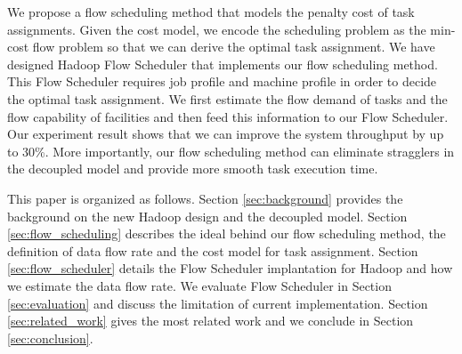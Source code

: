 We propose a flow scheduling method that models the penalty cost of task assignments.
Given the cost model, we encode the scheduling problem as the min-cost flow problem so that we can derive the optimal task assignment.
We have designed Hadoop Flow Scheduler that implements our flow scheduling method.
This Flow Scheduler requires job profile and machine profile in order to decide the optimal task assignment.
We first estimate the flow demand of tasks and the flow capability of facilities and then feed this information to our Flow Scheduler.
Our experiment result shows that we can improve the system throughput by up to 30\%.
More importantly, our flow scheduling method can eliminate stragglers in the decoupled model and provide more smooth task execution time.

This paper is organized as follows.
Section \ref{sec:background} provides the background on the new Hadoop design and the decoupled model.
Section \ref{sec:flow_scheduling} describes the ideal behind our flow scheduling method, the definition of data flow rate and the cost model for task assignment.
Section \ref{sec:flow_scheduler} details the Flow Scheduler implantation for Hadoop and how we estimate the data flow rate.
We evaluate Flow Scheduler in  Section \ref{sec:evaluation} and discuss the limitation of current implementation.
Section \ref{sec:related_work} gives the most related work and we conclude in Section \ref{sec:conclusion}.
